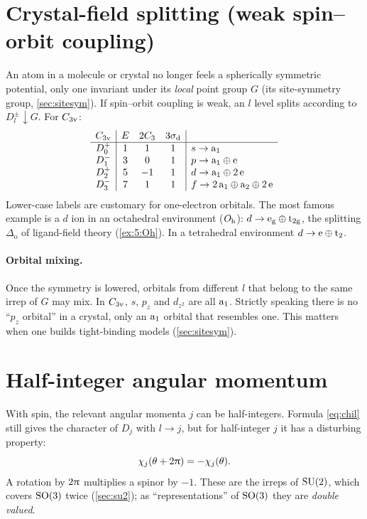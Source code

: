 \section{Crystal-field splitting (weak spin--orbit coupling)}\label{sec:crystalfield}

An atom in a molecule or crystal no longer feels a spherically symmetric potential,
only one invariant under its \emph{local} point group $G$ (its site-symmetry group,
\cref{sec:sitesym}). If spin--orbit coupling is weak, an $l$ level splits according
to $D_l^{\pm}\!\downarrow\!G$. For $C_{3\mathrm{v}}$:
\begin{equation}\label{eq:C3vsplit}
\begin{array}{c|ccc|l}
C_{3\mathrm{v}} & E & 2C_3 & 3\sigma_{\mathrm{d}} & \\\hline
D_0^+ & 1 & 1 & 1 & s\to\mathrm{a}_1\\
D_1^- & 3 & 0 & 1 & p\to\mathrm{a}_1\oplus\mathrm{e}\\
D_2^+ & 5 & -1 & 1 & d\to\mathrm{a}_1\oplus2\,\mathrm{e}\\
D_3^- & 7 & 1 & 1 & f\to2\,\mathrm{a}_1\oplus\mathrm{a}_2\oplus2\,\mathrm{e}
\end{array}
\end{equation}
Lower-case labels are customary for one-electron orbitals. The most famous example is
a $d$ ion in an octahedral environment ($O_{\mathrm{h}}$): $d\to\mathrm{e}_{\mathrm{g}}\oplus
\mathrm{t}_{2\mathrm{g}}$, the splitting $\Delta_{\mathrm{o}}$ of ligand-field theory
(\cref{ex:5:Oh}). In a tetrahedral environment $d\to\mathrm{e}\oplus\mathrm{t}_2$.

\paragraph{Orbital mixing.} Once the symmetry is lowered, orbitals from different
$l$ that belong to the same irrep of $G$ may mix. In $C_{3\mathrm{v}}$, $s$, $p_z$ and $d_{z^2}$
are all $\mathrm{a}_1$. Strictly speaking there is no ``$p_z$ orbital'' in a crystal, only
an $\mathrm{a}_1$ orbital that resembles one. This matters when one builds tight-binding
models (\cref{sec:sitesym}).

\section{Half-integer angular momentum}\label{sec:doublevalued}

With spin, the relevant angular momenta $j$ can be half-integers. Formula
\eqref{eq:chil} still gives the character of $D_j$ with $l\to j$, but for half-integer
$j$ it has a disturbing property:
\[
\chi_j(\theta+2\uppi)=-\chi_j(\theta).
\]
A rotation by $2\uppi$ multiplies a spinor by $-1$. These are the irreps of $\mathrm{SU}(2)$,
which covers $\mathrm{SO}(3)$ twice (\cref{sec:su2}); as ``representations'' of $\mathrm{SO}(3)$ they
are \emph{double valued}.


